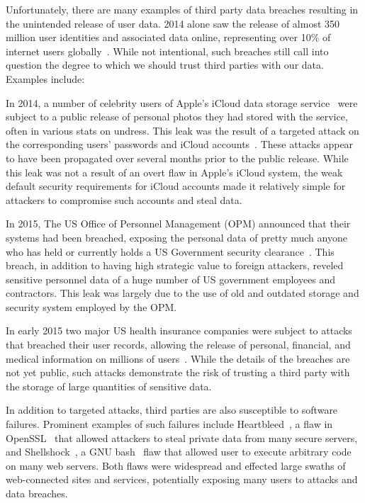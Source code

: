 Unfortunately, there are many examples of third party data breaches
resulting in the unintended release of user data. 2014 alone saw the
release of almost 350 million user identities and associated data
online, representing over 10\% of internet users
globally~\cite{symanteccorporation2015}. While not intentional, such
breaches still call into question the degree to which we should trust
third parties with our data. Examples include:

\begin{packed_desc}
\item[Apple iCloud Celebrity Photo Leak:] In 2014, a number of
  celebrity users of Apple's iCloud data storage
  service~\cite{apple-icloud} were subject to a public release of
  personal photos they had stored with the service, often in various
  stats on undress. This leak was the result of a targeted attack on
  the corresponding users' passwords and iCloud
  accounts~\cite{apple-icloudleak}. These attacks appear to have been
  propagated over several months prior to the public release. While
  this leak was not a result of an overt flaw in Apple's iCloud
  system, the weak default security requirements for iCloud accounts
  made it relatively simple for attackers to compromise such accounts
  and steal data.
\item[Office of Personnel Management Breach:] In 2015, The US Office
  of Personnel Management (OPM) announced that their systems had been
  breached, exposing the personal data of pretty much anyone who has
  held or currently holds a US Government security
  clearance~\cite{ars-opmhack, opm-cybersecurityincidents}. This
  breach, in addition to having high strategic value to foreign
  attackers, reveled sensitive personnel data of a huge number of US
  government employees and contractors. This leak was largely due to
  the use of old and outdated storage and security system employed by
  the OPM.
\item[Anthem and Premera Blue Cross Breaches:] In early 2015 two major
  US health insurance companies were subject to attacks that breached
  their user records, allowing the release of personal, financial, and
  medical information on millions of users~\cite{krebs-anthem,
    krebs-premera}. While the details of the breaches are not yet
  public, such attacks demonstrate the risk of trusting a third party
  with the storage of large quantities of sensitive data.
\item[Heartbleed, Shellshock, Etc:] In addition to targeted attacks,
  third parties are also susceptible to software failures. Prominent
  examples of such failures include Heartbleed~\cite{heartbleed}, a
  flaw in OpenSSL~\cite{openssl} that allowed attackers to steal
  private data from many secure servers, and
  Shellshock~\cite{symantec-shellshock}, a GNU bash~\cite{gnu-bash}
  flaw that allowed user to execute arbitrary code on many web
  servers. Both flaws were widespread and effected large swaths of
  web-connected sites and services, potentially exposing many users to
  attacks and data breaches.
\end{packed_desc}

